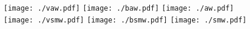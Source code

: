 \documentclass[preview=true]{standalone}
\title{}
\author{}
\begin{document}
\begin{landscape}

\begin{figure}
\texttt{[image: ./vaw.pdf]}
\texttt{[image: ./baw.pdf]}
\texttt{[image: ./aw.pdf]}
\\
\texttt{[image: ./vsmw.pdf]}
\texttt{[image: ./bsmw.pdf]}
\texttt{[image: ./smw.pdf]}
\end{figure}

\end{landscape}
\end{document}

